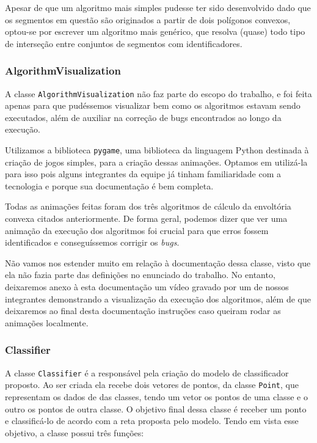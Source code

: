 \documentclass{article}
\begin{document}
Apesar de que um algoritmo mais simples pudesse ter sido desenvolvido dado que os segmentos em questão são originados a partir de dois polígonos convexos, optou-se por escrever um algoritmo mais genérico, que resolva (quase) todo tipo de interseção entre conjuntos de segmentos com identificadores.

\subsubsection{AlgorithmVisualization}

A classe \texttt{AlgorithmVisualization} não faz parte do escopo do trabalho, e foi feita apenas para que pudéssemos visualizar bem como os algoritmos estavam sendo executados, além de auxiliar na correção de bugs encontrados ao longo da execução.

Utilizamos a biblioteca \texttt{pygame}, uma biblioteca da linguagem Python destinada à criação de jogos simples, para a criação dessas animações. Optamos em utilizá-la para isso pois alguns integrantes da equipe já tinham familiaridade com a tecnologia e porque sua documentação é bem completa.

Todas as animações feitas foram dos três algoritmos de cálculo da envoltória convexa citados anteriormente. De forma geral, podemos dizer que ver uma animação da execução dos algoritmos foi crucial para que erros fossem identificados e conseguíssemos corrigir os \textit{bugs}.

Não vamos nos estender muito em relação à documentação dessa classe, visto que ela não fazia parte das definições no enunciado do trabalho. No entanto, deixaremos anexo à esta documentação um vídeo gravado por um de nossos integrantes demonstrando a visualização da execução dos algoritmos, além de que deixaremos ao final desta documentação instruções caso queiram rodar as animações localmente.

\subsubsection{Classifier}

A classe \texttt{Classifier} é a responsável pela criação do modelo de classificador proposto. Ao ser criada ela recebe dois vetores de pontos, da classe \texttt{Point}, que representam os dados de das classes, tendo um vetor os pontos de uma classe e o outro os pontos de outra classe. O objetivo final dessa classe é receber um ponto e classificá-lo de acordo com a reta proposta pelo modelo. Tendo em vista esse objetivo, a classe possui três funções:
\end{document}
